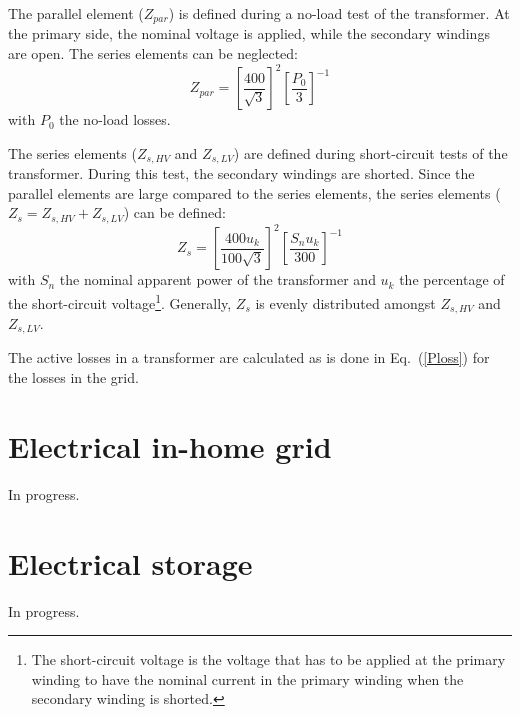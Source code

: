 The parallel element ($Z_{par}$) is defined during a no-load test of the transformer. At the primary side, the nominal voltage is applied, while the secondary windings are open. The series elements can be neglected:
\begin{equation}
Z_{par} = \left[ \frac{400}{\sqrt{3}} \right]^2 \left[ \frac{P_0}{3} \right]^{-1}
\label{3Ploss}
\end{equation}
with $P_0$ the no-load losses.

The series elements ($Z_{s,HV}$ and $Z_{s,LV}$) are defined during short-circuit tests of the transformer. During this test, the secondary windings are shorted. Since the parallel elements are large compared to the series elements, the series elements ($Z_s = Z_{s,HV} + Z_{s,LV}$)  can be defined:
\begin{equation}
Z_s = \left[ \frac{400 u_k}{100 \sqrt{3}} \right]^2 \left[ \frac{S_n u_k}{300} \right]^{-1}
\label{3Ploss}
\end{equation}
with $S_n$ the nominal apparent power of the transformer and $u_k$ the percentage of the short-circuit voltage\footnote{The short-circuit voltage is the voltage that has to be applied at the primary winding to have the nominal current in the primary winding when the secondary winding is shorted.}. Generally, $Z_s$ is evenly distributed amongst $Z_{s,HV}$ and $Z_{s,LV}$.

The active losses in a transformer are calculated as is done in Eq.~(\ref{Ploss}) for the losses in the grid. 

\section{Electrical in-home grid}
In progress.

\section{Electrical storage}
In progress.